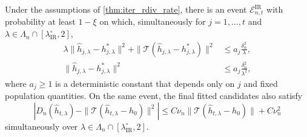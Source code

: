 \begin{lemma}\label{lemma:iter_rdiv_stability}
Under the assumptions of \cref{thm:iter_rdiv_rate}, there is an event $\mathcal E_{n,t}^{\mathrm{IR}}$ with probability at least $1-\xi$ on which, simultaneously for $j=1,\ldots,t$ and $\lambda\in\Lambda_n\cap[\lambda_{\mathrm{IR}}^\circ,2]$,
\begin{align}
\lambda\|\hat h_{j,\lambda}-h_{j,\lambda}^*\|^2
+\|\mathcal T(\hat h_{j,\lambda}-h_{j,\lambda}^*)\|^2
&\leqslant a_j\frac{\delta_n^2}{\lambda},
\label{eq:iter_rdiv_stability}\\
\|\hat h_{j,\lambda}-h_{j,\lambda}^*\|^2
&\leqslant a_j\frac{\delta_n^2}{\lambda^2},
\label{eq:iter_rdiv_strong_stability}
\end{align}
where $a_j\geqslant1$ is a deterministic constant that depends only on $j$
and fixed population quantities.
On the same event, the final fitted candidates also satisfy
\begin{equation}\label{eq:iter_rdiv_projected_comparison}
\left|D_n(\hat h_{t,\lambda})
-\|\mathcal T(\hat h_{t,\lambda}-h_0)\|^2\right|
\leqslant C\nu_n\|\mathcal T(\hat h_{t,\lambda}-h_0)\|+C\nu_n^2
\end{equation}
simultaneously over $\lambda\in\Lambda_n\cap[\lambda_{\mathrm{IR}}^\circ,2]$.


\end{lemma}
